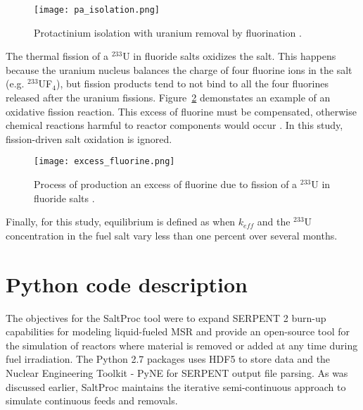\begin{figure}[hbp!] %
  \centering
  \vspace{-0.3em}
  \texttt{[image: pa\_isolation.png]}
  \caption{Protactinium isolation with uranium removal by fluorination \cite{robertson_conceptual_1971}.}
  \vspace{-1.6em}
  \label{fig:pa_isolation}
\end{figure}
\FloatBarrier

The thermal fission of a $^{233}$U in fluoride salts oxidizes the salt. This happens because the uranium nucleus balances the charge of four fluorine ions in the salt (e.g. $^{233}$UF$_4$), but fission products tend to not bind to all the four fluorines released after the uranium fissions. Figure~\ref{fig:excess_fluorine} demonstates an example of an oxidative fission reaction. This excess of fluorine must be compensated, otherwise chemical reactions harmful to reactor components would occur \cite{ridley_method_2017}. In this study, fission-driven salt oxidation is ignored.

\begin{figure}[htp!] %
  \centering
  \vspace{-0.3em}
  \texttt{[image: excess\_fluorine.png]}
  \caption{Process of production an excess of fluorine due to fission of a $^{233}$U in fluoride salts \cite{ridley_method_2017}.}
  \vspace{-1.0em}
  \label{fig:excess_fluorine}
\end{figure}
\FloatBarrier

Finally, for this study, equilibrium is defined as when $k_{eff}$ and the $^{233}$U concentration in the fuel salt vary less than one percent over several months. 

\section{Python code description}
The objectives for the SaltProc tool were to expand SERPENT 2 burn-up capabilities for modeling liquid-fueled \gls{MSR} and provide an open-source tool for the simulation of reactors where material is removed or added at any time during fuel irradiation. The Python 2.7 packages uses HDF5 \cite{the_hdf_group_hierarchical_1997} to store data and the Nuclear Engineering Toolkit - PyNE \cite{scopatz_pyne:_2012} for SERPENT output file parsing. As was discussed earlier, SaltProc maintains the iterative semi-continuous approach to simulate continuous feeds and removals.

